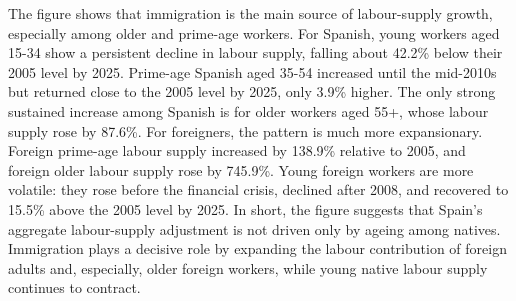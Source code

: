 The figure shows that immigration is the main source of labour-supply growth, especially among older and prime-age workers. For Spanish, young workers aged 15-34 show a persistent decline in labour supply, falling about 42.2\% below their 2005 level by 2025. Prime-age Spanish aged 35-54 increased until the mid-2010s but returned close to the 2005 level by 2025, only 3.9\% higher. The only strong sustained increase among Spanish is for older workers aged 55+, whose labour supply rose by 87.6\%. For foreigners, the pattern is much more expansionary. Foreign prime-age labour supply increased by 138.9\% relative to 2005, and foreign older labour supply rose by 745.9\%. Young foreign workers are more volatile: they rose before the financial crisis, declined after 2008, and recovered to 15.5\% above the 2005 level by 2025. In short, the figure suggests that Spain’s aggregate labour-supply adjustment is not driven only by ageing among natives. Immigration plays a decisive role by expanding the labour contribution of foreign adults and, especially, older foreign workers, while young native labour supply continues to contract.













